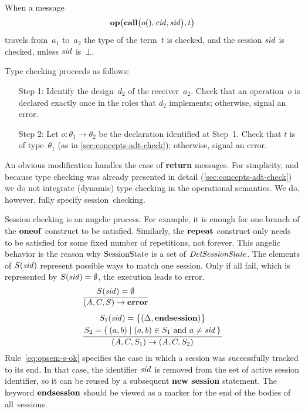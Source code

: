 \documentclass[a4paper,12pt,oneside,fleqn]{book} %
\newcommand{\on}[2]{\genfrac{}{}{0pt}{0}{\strut#1}{\strut#2}}
\begin{document}
When a message
\begin{align}
{\bf op}\bigl({\bf call}\bigl(o(), {\it cid}, {\it sid}\bigr), t\bigr)
\end{align}
travels from~$a_1$ to~$a_2$ the type of the term~$t$ is checked, and the
session $\it sid$ is checked, unless $\it sid$ is~$\bot$.

Type checking proceeds as follows:
\begin{itemize}
\item[Step 1:]
  Identify the design~$d_2$ of the receiver~$a_2$. Check that an
  operation~$o$ is declared exactly once in the roles that $d_2$
  implements; otherwise, signal an error.
\item[Step 2:]
  Let $o:\theta_1\to\theta_2$ be the declaration identified at Step~1.
  Check that $t$ is of type~$\theta_1$ (as in
  \autoref{sec:concepts-adt-check}); otherwise, signal an error.
\end{itemize}
An obvious modification handles the case of {\bf return} messages. For
simplicity, and because type checking was already presented in detail
(\autoref{sec:concepts-adt-check}) we do not integrate (dynamic) type
checking in the operational semantics. We do, however, fully specify
session~checking.

Session checking is an angelic process. For example, it is enough for one
branch of the $\bf oneof$ construct to be satisfied. Similarly, the $\bf
repeat$ construct only needs to be satisfied for some fixed number of
repetitions, not forever. This angelic behavior is the reason why $\rm
SessionState$ is a set of $\it DetSessionState$.  The elements of $S({\it
sid})$ represent possible ways to match one session. Only if all fail,
which is represented by $S({\it sid})=\emptyset$, the execution leads to
error.
\begin{align}
&\frac
  {S({\it sid})=\emptyset}
  {(A,C,S)\to{\bf error}}
\\[1ex]
&\frac
  {\on{S_1({\it sid})=\bigl\{(\Delta,{\bf endsession})\bigr\}}
      {S_2=\{\,(a,b)\mid\text{$(a,b)\in S_1$ and $a\ne{\it sid}$}\,\}}}
  {(A,C,S_1)\to(A,C,S_2)}
  \label{eq:opsem-s-ok}
\end{align}
Rule~\eqref{eq:opsem-s-ok} specifies the case in which a session was
successfully tracked to its end. In that case, the identifier $\it sid$ is
removed from the set of active session identifier, so it can be reused by a
subsequent {\bf new session} statement. The keyword $\bf endsession$ should
be viewed as a marker for the end of the bodies of all~sessions.
\end{document}
